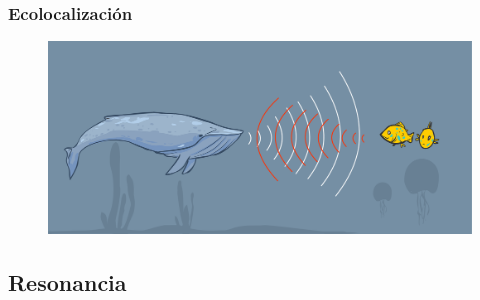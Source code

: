 \documentclass[14pt]{beamer}
\begin{document}
\begin{frame}
\frametitle{Ecolocalización}
\begin{figure}
    \centering
    \includegraphics[width = \linewidth]{Imagenes/Eco_02c.png}
\end{figure}
\end{frame}

\subsection{Resonancia}
\end{document}
